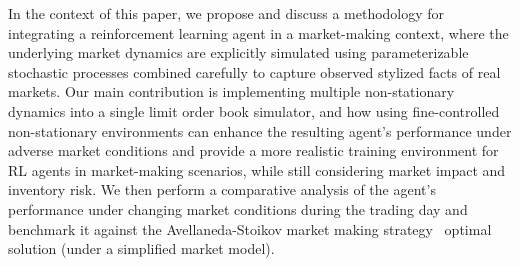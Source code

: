 In the context of this paper, we propose and discuss a methodology for integrating a reinforcement learning agent in a market-making context,
where the underlying market dynamics are explicitly simulated using parameterizable stochastic processes combined carefully to capture observed stylized facts of real markets.
Our main contribution is implementing multiple non-stationary dynamics into a single limit order book simulator,
and how using fine-controlled non-stationary environments can enhance the resulting agent's performance under adverse market conditions
and provide a more realistic training environment for RL agents in market-making scenarios, while still considering market impact and inventory risk.
We then perform a comparative analysis of the agent's performance under changing market conditions during the
trading day and benchmark it against the Avellaneda-Stoikov market making strategy~\cite{Avellaneda2008} optimal solution (under a simplified market model).
